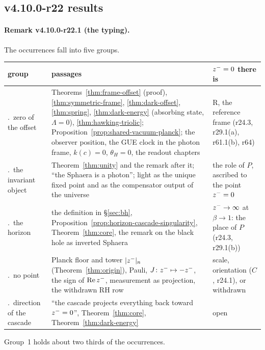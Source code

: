 \subsection*{v4.10.0-r22 results}
\label{subsec:v4100-r22-results}

\paragraph{Remark v4.10.0-r22.1 (the typing).}
The occurrences fall into five groups.
\begin{center}
\small
\begin{tabular}{@{}>{\raggedright\arraybackslash}p{}>{\raggedright\arraybackslash}p{}>{\raggedright\arraybackslash}p{}@{}}
\toprule
group & passages & \(z^-=0\) there is\\
\midrule
1.~zero of the offset & Theorems~\ref{thm:frame-offset} (proof), \ref{thm:symmetric-frame}, \ref{thm:dark-offset}, \ref{thm:spring}, \ref{thm:dark-energy} (absorbing state, \(\Lambda=0\)), \ref{thm:hawking-triolic}; Proposition~\ref{prop:shared-vacuum-planck}; the observer position, the GUE clock in the photon frame, \(k(c)=0\), \(\theta_H=0\), the readout chapters & R, the reference frame (r24.3, r29.1(a), r61.1(b), r64)\\
2.~the invariant object & Theorem~\ref{thm:unity} and the remark after it; ``the Sphaera is a photon''; light as the unique fixed point and as the compensator output of the universe & the role of \(P\), ascribed to the point \(z^-=0\)\\
3.~the horizon & the definition in \S\ref{sec:bh}, Proposition~\ref{prop:horizon-cascade-singularity}, Theorem~\ref{thm:core}, the remark on the black hole as inverted Sphaera & \(z^-\to\infty\) at \(\beta\to1\): the place of \(P\) (r24.3, r29.1(b))\\
4.~no point & Planck floor and tower \(|z^-|_n\) (Theorem~\ref{thm:origin}), Pauli, \(J\colon z^-\mapsto-z^-\), the sign of \(\operatorname{Re}z^-\), measurement as projection, the withdrawn RH row & scale, orientation (\(C\), r24.1), or withdrawn\\
5.~direction of the cascade & ``the cascade projects everything back toward \(z^-=0\)'', Theorem~\ref{thm:core}, Theorem~\ref{thm:dark-energy} & open\\
\bottomrule
\end{tabular}
\end{center}
Group~1 holds about two thirds of the occurrences.

